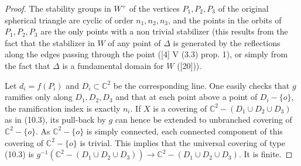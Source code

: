 \documentclass[12pt,a4paper]{article}
\theoremstyle{plain}
\theoremstyle{definition}
\theoremstyle{remark}
\begin{document}
\begin{proof}
The stability groups in $W^+$ of the vertices $P_1, P_2, P_3$ of the original spherical triangle are cyclic of order $n_1, n_2, n_3$, and the points in the orbits of $P_1, P_2, P_3$ are the only points with a non trivial stabilizer (this results from the fact that the stabilizer in $W$ of any point of $\Delta$ is generated by the reflections along the edges passing through the point ([4] V (3.3) prop. 1), or simply from the fact that $\Delta$ is a fundamental domain for $W$ ([20])).

Let $d_i = f(P_i)$ and $D_i \subset \mathbb{C}^2$ be the corresponding line. One easily checks that $g$ ramifies only along $D_1, D_2, D_3$ and that at each point above a point of $D_i - \{o\}$, the ramification index is exactly $n_i$. If $X$ is a covering of $\mathbb{C}^2 - (D_1 \cup D_2 \cup D_3)$ as in (10.3), its pull-back by $g$ can hence be extended to unbranched covering of $\mathbb{C}^2 - \{o\}$. As $\mathbb{C}^2 - \{o\}$ is simply connected, each connected component of this covering of $\mathbb{C}^2 - \{o\}$ is trivial. This implies that the universal covering of type (10.3) is $g^{-1}(\mathbb{C}^2 - (D_1 \cup D_2 \cup D_3)) \to \mathbb{C}^2 - (D_1 \cup D_2 \cup D_3)$. It is finite.
\end{proof}
\end{document}
